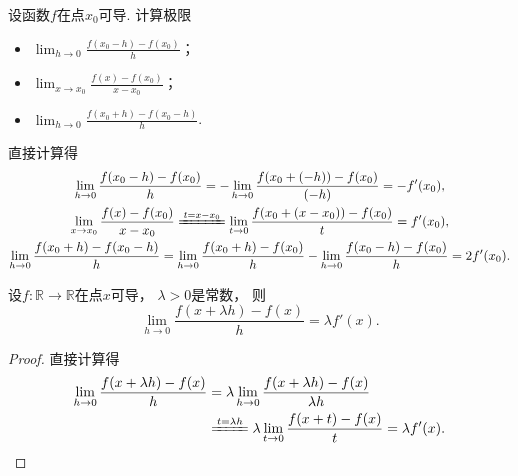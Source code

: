 \begin{example}\label{example:导数.导数定义式的变形}
设函数\(f\)在点\(x_0\)可导.
计算极限\begin{itemize}
	\item \(\lim_{h\to0} \frac{f(x_0 - h) - f(x_0)}{h}\)；
	\item \(\lim_{x \to x_0} \frac{f(x) - f(x_0)}{x - x_0}\)；
	\item \(\lim_{h\to0} \frac{f(x_0+h) - f(x_0-h)}{h}\).
\end{itemize}
\begin{solution}
直接计算得\begin{gather*}
	\lim_{h\to0} \frac{f(x_0 - h) - f(x_0)}{h}
	= - \lim_{h\to0} \frac{f(x_0 + (-h)) - f(x_0)}{(-h)}
	= - f'(x_0), \\
	\lim_{x \to x_0} \frac{f(x) - f(x_0)}{x - x_0}
	\xlongequal{t = x - x_0}
	\lim_{t \to 0} \frac{f(x_0 + (x - x_0)) - f(x_0)}{t}
	= f'(x_0), \\
	\lim_{h\to0} \frac{f(x_0+h) - f(x_0-h)}{h}
	= \lim_{h\to0} \frac{f(x_0+h) - f(x_0)}{h}
	- \lim_{h\to0} \frac{f(x_0-h) - f(x_0)}{h}
	= 2 f'(x_0).
\end{gather*}
\end{solution}
\end{example}

\begin{proposition}
设\(f\colon\mathbb{R}\to\mathbb{R}\)在点\(x\)可导，
\(\lambda>0\)是常数，
则\begin{equation*}
	\lim_{h\to0} \frac{f(x+\lambda h)-f(x)}{h}
	= \lambda f'(x).
\end{equation*}
\begin{proof}
直接计算得\begin{align*}
	\lim_{h\to0} \frac{f(x+\lambda h)-f(x)}{h}
	&= \lambda \lim_{h\to0} \frac{f(x+\lambda h)-f(x)}{\lambda h} \\
	&\xlongequal{t=\lambda h}
		\lambda \lim_{t\to0} \frac{f(x+t)-f(x)}{t}
	= \lambda f'(x).
	\qedhere
\end{align*}
\end{proof}
\end{proposition}

